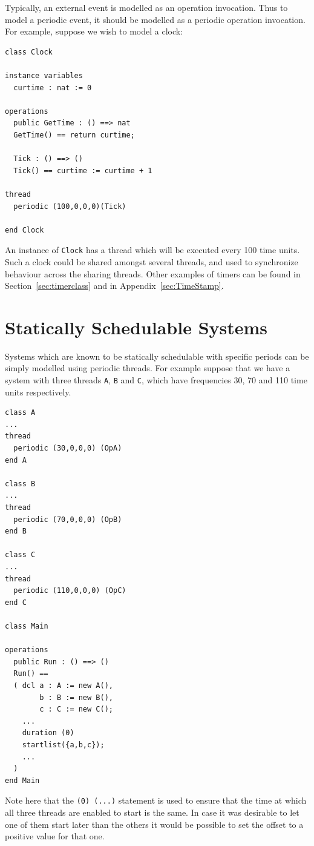 \documentclass{overturerepchap}
\begin{document}
Typically, an external event is modelled as an operation
invocation. Thus to model a periodic event, it should be modelled as a
periodic operation invocation. For example, suppose we wish to model a
clock:

\begin{lstlisting}
class Clock

instance variables
  curtime : nat := 0

operations
  public GetTime : () ==> nat
  GetTime() == return curtime;

  Tick : () ==> ()
  Tick() == curtime := curtime + 1

thread
  periodic (100,0,0,0)(Tick)

end Clock
\end{lstlisting}

An instance of \texttt{Clock} has a thread which will be executed
every 100 time units. Such a clock could be shared amongst several
threads, and used to synchronize behaviour across the sharing threads. 
Other examples of timers can be found in Section~\ref{sec:timerclass} and 
in Appendix~\ref{sec:TimeStamp}.

\section{Statically Schedulable Systems}

Systems which are known to be statically schedulable with specific
periods can be simply modelled using periodic threads. For example
suppose that we have a system with three threads \texttt{A},
\texttt{B} and \texttt{C}, which have frequencies 30, 70 and 110 time
units respectively.

\begin{lstlisting}
class A
...
thread
  periodic (30,0,0,0) (OpA)
end A

class B
...
thread
  periodic (70,0,0,0) (OpB)
end B

class C
...
thread
  periodic (110,0,0,0) (OpC)
end C

class Main

operations
  public Run : () ==> ()
  Run() ==
  ( dcl a : A := new A(),
        b : B := new B(),
        c : C := new C();
    ...
    duration (0)
    startlist({a,b,c});
    ...
  )
end Main
\end{lstlisting}

Note here that the {\bf{}}\texttt{(0) }{\bf{}}\texttt{(...)} statement is
used to ensure that the time at which all three threads are enabled to
start is the same. In case it was desirable to let one of them start later 
than the others it would be possible to set the offset to a positive
value for that one.
\end{document}
